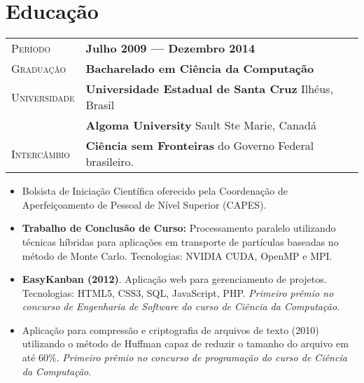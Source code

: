 \documentclass[9pt, a4paper, oneside, final]{scrartcl} %
\newcommand{\gray}{\rowcolor[gray]{.90}} %
\begin{document}


\section{Educação}

\begin{tabularx}{1.0\linewidth}{>{\raggedleft\scshape}p{2.34cm}X}
\gray Período & \textbf{Julho 2009 --- Dezembro 2014}\\
\gray Graduação & \textbf{Bacharelado em Ciência da Computação}\\
\gray Universidade & \textbf{Universidade Estadual de Santa Cruz} \hfill Ilhéus, Brasil\\
\gray & \textbf{Algoma University} \hfill Sault Ste Marie, Canadá\\
\gray Intercâmbio & \textbf{Ciência sem Fronteiras} do Governo Federal brasileiro.
\end{tabularx}

\begin{itemize}\itemsep1.5pt

\item Bolsista de Iniciação Científica oferecido pela Coordenação de Aperfeiçoamento de Pessoal de Nível Superior (CAPES).

  \item \textbf{Trabalho de Conclusão de Curso:} Processamento paralelo utilizando técnicas híbridas para aplicações em transporte de partículas baseadas no método de Monte Carlo. Tecnologias: NVIDIA CUDA, OpenMP e MPI.
   
  \item \textbf{EasyKanban (2012)}. Aplicação web para gerenciamento de projetos. Tecnologias: HTML5, CSS3, SQL, JavaScript, PHP. \textit{Primeiro prêmio no concurso de Engenharia de Software do curso de Ciência da Computação}.
  
  \item Aplicação para compressão e criptografia de arquivos de texto (2010) utilizando o método de Huffman capaz de reduzir o tamanho do arquivo em até 60\%. \textit{Primeiro prêmio no concurso de programação do curso de Ciência da Computação}. 
  
\end{itemize}
\end{document}
